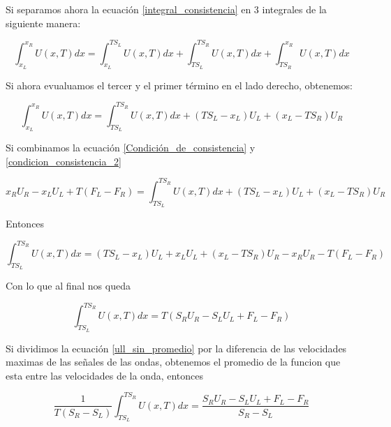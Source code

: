 \documentclass[12pt,a4paper]{book}
\begin{document}
Si separamos ahora la ecuación \ref{integral_consistencia} en 3 integrales de la siguiente manera:

\begin{equation}
\int_{x_L}^{x_R} U\left( x, T \right) dx = 
\int_{x_L}^{T S_L} U \left(x, T \right)dx+
\int_{T S_L}^{T S_R} U \left(x, T \right)dx+
\int_{T S_R}^{x_R} U \left(x, T \right)dx
\end{equation}

Si ahora evualuamos el tercer y el primer término en el lado derecho, obtenemos:

\begin{equation}\label{condicion_consistencia_2}
\int_{x_L}^{x_R} U\left( x, T \right) dx =
\int_{T S_L}^{T S_R} U \left(x, T \right)dx+
\left( T S_L - x_L \right) U_L+
\left( x_L - T S_R \right) U_R
\end{equation}

Si combinamos la ecuación \ref{Condición_de_consistencia} y 
\ref{condicion_consistencia_2}

\begin{equation*}
x_R U_R -x_L U_L+T \left( F_L- F_R \right) =
\int_{T S_L}^{T S_R} U \left(x, T \right)dx+
\left( T S_L - x_L \right) U_L+
\left( x_L - T S_R \right) U_R
\end{equation*}

Entonces 

\begin{equation*}
\int_{T S_L}^{T S_R} U \left(x, T \right)dx=
\left( T S_L - x_L \right) U_L+ x_L U_L +
\left( x_L - T S_R \right) U_R-x_R U_R -
T \left( F_L- F_R \right)
\end{equation*}

Con lo que al final nos queda

\begin{equation} \label{ull_sin_promedio}
\int_{T S_L}^{T S_R} U \left(x, T \right)dx=
T \left( S_R U_R - S_L U_L + F_L - F_R \right)
\end{equation}

Si dividimos la ecuación \ref{ull_sin_promedio} por la diferencia de las velocidades maximas de las señales de las ondas, obtenemos el promedio de la funcion que esta entre las velocidades de la onda, entonces

\begin{equation}
\frac{1}{T \left( S_R -S_L \right)}\int_{T S_L}^{T S_R} U \left(x, T \right)dx =
\frac{S_R U_R - S_L U_L + F_L - F_R}{S_R - S_L}
\end{equation}
\end{document}
